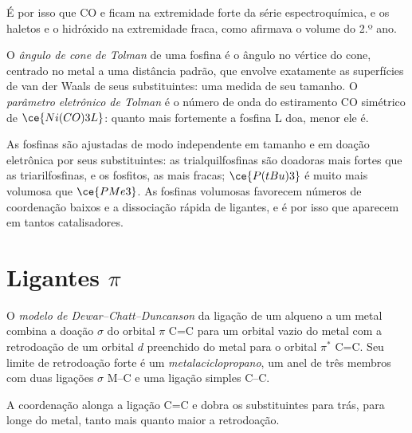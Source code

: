 É por isso que CO e  ficam na extremidade forte da série espectroquímica, e os
haletos e o hidróxido na extremidade fraca, como afirmava o volume do 2.º ano.

\begin{definition}\label{def:b3:organometallic-bonding:tolman}
O \emph{ângulo de cone de Tolman} de uma fosfina é o ângulo
no vértice do cone, centrado no metal a uma distância padrão, que envolve exatamente
as superfícies de van der Waals de seus substituintes: uma medida de seu tamanho.
O \emph{parâmetro eletrônico de Tolman} é o
número de onda do estiramento CO simétrico de $\ce{Ni(CO)3L}$: quanto mais fortemente a
fosfina L doa, menor ele é.
\end{definition}

As fosfinas são ajustadas de modo independente em tamanho e em doação eletrônica por seus
substituintes: as trialquilfosfinas são doadoras mais fortes que as triarilfosfinas,
e os fosfitos, as mais fracas; $\ce{P(tBu)3}$ é muito mais volumosa que $\ce{PMe3}$. As fosfinas volumosas favorecem
números de coordenação baixos e a dissociação rápida de ligantes, e é por isso que
aparecem em tantos catalisadores.

\section{Ligantes $\pi$}

\begin{definition}\label{def:b3:organometallic-bonding:dcd}
O \emph{modelo de Dewar--Chatt--Duncanson} da
ligação de um alqueno a um metal combina a doação $\sigma$ do orbital $\pi$ C=C
para um orbital vazio do metal com a retrodoação de um orbital $d$ preenchido do metal para
o orbital $\pi^*$ C=C. Seu limite de retrodoação forte é um
\emph{metalaciclopropano}, um anel de três membros
com duas ligações $\sigma$ M--C e uma ligação simples C--C.
\end{definition}

\begin{proposition}\label{prop:b3:organometallic-bonding:dcd}
A coordenação alonga a ligação C=C e dobra os substituintes para trás, para longe do
metal, tanto mais quanto maior a retrodoação.
\end{proposition}

